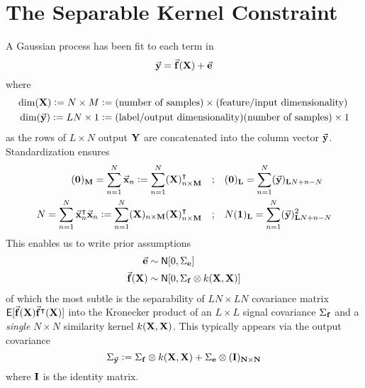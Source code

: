 \documentclass[a4paper, margin=1in, reqno]{RAMArticle}
\begin{document}
\section{The Separable Kernel Constraint}
	A Gaussian process has been fit to each term in
	\begin{equation*}
		\vec{\mathbf{y}} = \vec{\mathbf{f}}(\mathbf{X}) + \vec{\mathbf{e}}
	\end{equation*}
	where
	\begin{align*}
		\dim(\mathbf{X}) \mathrel{\mathop:}= N \times M &\mathrel{\mathop:}= (\text{number of samples}) \times (\text{feature/input dimensionality}) \\
		\dim(\vec{\mathbf{y}}) \mathrel{\mathop:}= LN\times 1 &\mathrel{\mathop:}= (\text{label/output dimensionality})(\text{number of samples}) \times 1
	\end{align*}
	as the rows of \(L\times N\) output \(\mathbf{Y}\) are concatenated into the column vector \(\vec{\mathbf{y}}\). 
	Standardization ensures
	\begin{align*}
		(\vr{0})_\vr{M} = \sum_{n=1}^{N} \vec{\vr{x}}_{n} \deq \sum_{n=1}^{N} (\vr{X})_{n \times \vr{M}}^{\intercal} 
		&\QT{;} (\vr{0})_{\vr{L}} = \sum_{n=1}^{N} (\vec{\vr{y}})_{\vr{L}N+n-N} \\
		N = \sum_{n=1}^{N} \vec{\vr{x}}_{n}^{\intercal}\vec{\vr{x}}_{n} \deq \sum_{n=1}^{N} (\vr{X})_{n \times \vr{M}} (\vr{X})_{n \times \vr{M}}^{\intercal}
		&\QT{;} N (\vr{1})_{\vr{L}} = \sum_{n=1}^{N} (\vec{\vr{y}})^{2}_{\vr{L}N+n-N}	
	\end{align*}
	This enables us to write prior assumptions
	\begin{align*}
		\vec{\mathbf{e}} &\sim \mathsf{N} [0, \Sigma_{\mathbf{e}}] \\
		\vec{\mathbf{f}}(\mathbf{X}) &\sim \mathsf{N}[0, \Sigma_{\mathbf{f}} \otimes k(\mathbf{X},\mathbf{X})]
	\end{align*}
	of which the most subtle is the separability of \(LN\times LN\) covariance matrix \(\mathsf{E}[\vec{\mathbf{f}}(\mathbf{X})\vec{\mathbf{f}}^{\intercal}(\mathbf{X})]\) 
	into the Kronecker product of an \(L \times L\) signal covariance \(\Sigma_{\mathbf{f}}\) and a \textit{single} \(N \times N\) similarity kernel \(k(\mathbf{X},\mathbf{X})\).
	This typically appears via the output covariance
	\begin{equation*}
		\Sigma_{\vec{\mathbf{y}}} \mathrel{\mathop:}= \Sigma_{\mathbf{f}} \otimes k(\mathbf{X},\mathbf{X}) + \Sigma_{\mathbf{e}} \otimes (\mathbf{I})_{\mathbf{N}\times\mathbf{N}}
	\end{equation*}
	where \(\mathbf{I}\) is the identity matrix.
\end{document}
